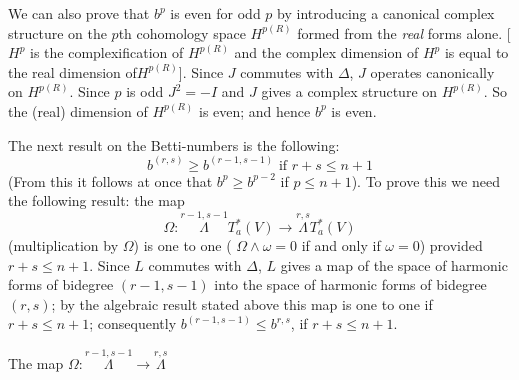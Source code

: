 We can also prove that $b^{p}$ is even for odd $p$ by introducing a
canonical complex structure on the $p$th cohomology space $H^{p(R)}$
formed from the {\em real} forms alone. [$H^{p}$ is the
  complexification of $H^{p(R)}$ and the complex dimension of $H^{p}$
  is equal to the real dimension of\pageoriginale $H^{p(R)}$]. Since
$J$ commutes with $\Delta$, $J$ operates canonically on
$H^{p(R)}$. Since $p$ is odd $J^{2}=-I$ and $J$ gives a complex
structure on $H^{p(R)}$. So the (real) dimension of $H^{p(R)}$ is
even; and hence $b^{p}$ is even.

The next result on the Betti-numbers is the following:
$$
b^{(r,s)}\geq b^{(r-1,s-1)}\text{ \  if \ } r+s\leq n+1
$$
(From this it follows at once that $b^{p}\geq b^{p-2}$ if $p\leq
n+1$). To prove this we need the following result: the map
$$
\Omega:\overset{r-1,s-1}{\Lambda}T^{\ast}_{a}(V)\to
\overset{r,s}{\Lambda}T^{\ast}_{a}(V)
$$
(multiplication by $\Omega$) is one to one (\iec
$\Omega\wedge\omega=0$ if and only if $\omega=0$) provided $r+s\leq
n+1$. Since $L$ commutes with $\Delta$, $L$ gives a map of the space
of harmonic forms of bidegree $(r-1,s-1)$ into the space of harmonic
forms of bidegree $(r,s)$; by the algebraic result stated above this
map is one to one if $r+s\leq n+1$; consequently $b^{(r-1,s-1)}\leq
b^{r,s}$, if $r+s\leq n+1$.

The map $\Omega:\overset{r-1,s-1}{\Lambda}\to \overset{r,s}{\Lambda}$

